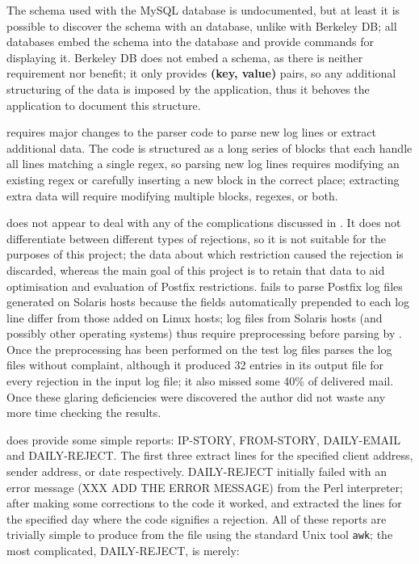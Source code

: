 The schema used with the MySQL database is undocumented, but at least it is
possible to discover the schema with an \SQL{} database, unlike with
Berkeley DB\@; all \SQL{} databases embed the schema into the database and
provide commands for displaying it.  Berkeley DB does not embed a schema,
as there is neither requirement nor benefit; it only provides \textbf{(key,
value)} pairs, so any additional structuring of the data is imposed by the
application, thus it behoves the application to document this structure.

\LMA{} requires major changes to the parser code to parse new log lines or
extract additional data.  The code is structured as a long series of blocks
that each handle all lines matching a single regex, so parsing new log
lines requires modifying an existing regex or carefully inserting a new
block in the correct place; extracting extra data will require modifying
multiple blocks, regexes, or both.

\LMA{} does not appear to deal with any of the complications discussed in
.  It does not differentiate between different
types of rejections, so it is not suitable for the purposes of this
project; the data about which restriction caused the rejection is
discarded, whereas the main goal of this project is to retain that data to
aid optimisation and evaluation of Postfix restrictions.  \LMA{} fails to
parse Postfix log files generated on Solaris hosts because the fields
automatically prepended to each log line differ from those added on Linux
hosts; log files from Solaris hosts (and possibly other operating systems)
thus require preprocessing before parsing by \LMA{}.  Once the
preprocessing has been performed on the \numberOFlogFILES{} test log files
\LMA{} parses the log files without complaint, although it produced 32
entries in its output file for every rejection in the input log file; it
also missed some 40\% of delivered mail.  Once these glaring deficiencies
were discovered the author did not waste any more time checking the
results.

\LMA{} does provide some simple reports: IP-STORY, FROM-STORY, DAILY-EMAIL
and DAILY-REJECT\@.  The first three extract \CSV{} lines for the specified
client \IP{} address, sender address, or date respectively.  DAILY-REJECT
initially failed with an error message (XXX ADD THE ERROR MESSAGE) from the
Perl interpreter; after making some corrections to the code it worked, and
extracted the \CSV{} lines for the specified day where the \SMTP{} code
signifies a rejection.  All of these reports are trivially simple to
produce from the \CSV{} file using the standard Unix tool \texttt{awk}; the
most complicated, DAILY-REJECT, is merely:

